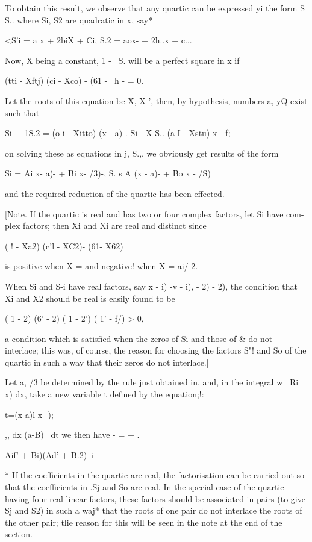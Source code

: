 To obtain this result, we observe that any quartic can be expressed yi
the form S S.. where Si, S2 are quadratic in x, say*

<S'i = a x + 2biX + Ci, S.2 = aox- + 2h..x + c.,.

Now, X being a constant, 1 - \ S. will be a perfect square in x if

(tti - Xftj) (ci - Xco) - (61 - \ h - = 0.

Let the roots of this equation be X, X ', then, by hypothesis,
numbers a, yQ exist such that

Si - \ 1S.2 = (o-i - Xitto) (x - a)-. Si - X S.. (a I - Xstu) x - f;

on solving these as equations in j, S.,, we obviously get results of
the form

Si = Ai x- a)- + Bi x- /3)-, S. s A (x - a)- + Bo x - /S)

and the required reduction of the quartic has been effected.

[Note. If the quartic is real and has two or four complex factors, let
Si have com- plex factors; then Xi and Xi are real and distinct since

( ! - Xa2) (c'l - XC2)- (61- X62)

is positive when X = and negative! when X = ai/ 2.

When Si and S-i have real factors, say x - i) -v - i), - 2) - 2), the
condition that Xi and X2 should be real is easily found to be

( 1 - 2) (6' - 2) ( 1 - 2') ( 1' - f/) > 0,

a condition which is satisfied when the zeros of Si and those of \& do
not interlace; this was, of course, the reason for choosing the
factors S"! and So of the quartic in such a way that their zeros do
not interlace.]


Let a, /3 be determined by the rule just obtained in, and, in
the integral w~ Ri x) dx, take a new variable t defined by the
equation;!:

t=(x-a)l x- );

,, dx (a-B)~ dt we then have - = + .

    Aif' + Bi)(Ad' + B.2)\ i

* If the coefficients in the quartic are real, the factorisation can
be carried out so that the coefficients in .Sj and So are real. In the
special case of the quartic having four real linear factors, these
factors should be associated in pairs (to give Sj and S2) in such a
waj* that the roots of one pair do not interlace the roots of the
other pair; tlie reason for this will be seen in the note at the end
of the section.

